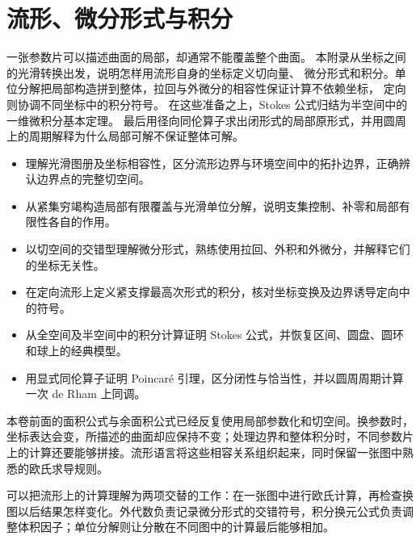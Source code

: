 \chapter{流形、微分形式与积分}
\label{b1:app:E}

\begin{chapterabstract}
一张参数片可以描述曲面的局部，却通常不能覆盖整个曲面。
本附录从坐标之间的光滑转换出发，说明怎样用流形自身的坐标定义切向量、
微分形式和积分。单位分解把局部构造拼到整体，拉回与外微分的相容性保证计算不依赖坐标，
定向则协调不同坐标中的积分符号。
在这些准备之上，Stokes 公式归结为半空间中的一维微积分基本定理。
最后用径向同伦算子求出闭形式的局部原形式，并用圆周上的周期解释为什么局部可解不保证整体可解。
\end{chapterabstract}

\begin{learninggoals}
\begin{itemize}
\item\label{b1:item:E-goal-charts}理解光滑图册及坐标相容性，区分流形边界与环境空间中的拓扑边界，正确辨认边界点的完整切空间。
\item\label{b1:item:E-goal-localization}从紧集穷竭构造局部有限覆盖与光滑单位分解，说明支集控制、补零和局部有限性各自的作用。
\item\label{b1:item:E-goal-forms}以切空间的交错型理解微分形式，熟练使用拉回、外积和外微分，并解释它们的坐标无关性。
\item\label{b1:item:E-goal-integration}在定向流形上定义紧支撑最高次形式的积分，核对坐标变换及边界诱导定向中的符号。
\item\label{b1:item:E-goal-stokes}从全空间及半空间中的积分计算证明 Stokes 公式，并恢复区间、圆盘、圆环和球上的经典模型。
\item\label{b1:item:E-goal-local-global}用显式同伦算子证明 Poincaré 引理，区分闭性与恰当性，并以圆周周期计算一次 de Rham 上同调。
\end{itemize}
\end{learninggoals}

本卷前面的面积公式与余面积公式已经反复使用局部参数化和切空间。换参数时，坐标表达会变，所描述的曲面却应保持不变；处理边界和整体积分时，不同参数片上的计算还要能够拼接。流形语言将这些相容关系组织起来，同时保留一张图中熟悉的欧氏求导规则。

\ProseParagraphBreak

可以把流形上的计算理解为两项交替的工作：在一张图中进行欧氏计算，再检查换图以后结果怎样变化。外代数负责记录微分形式的交错符号，积分换元公式负责调整体积因子；单位分解则让分散在不同图中的计算最后能够相加。

